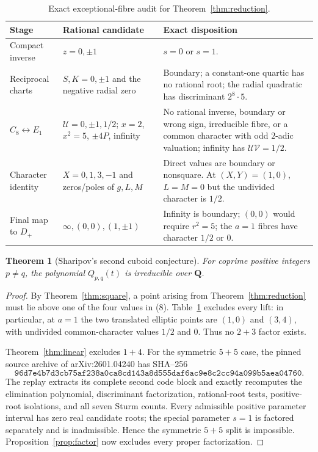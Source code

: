 \documentclass[11pt]{article}
\newtheorem{theorem}{Theorem}
\newcommand{\Q}{\mathbf Q}
\begin{document}
\begin{table}[ht]
\centering
\small
\begin{tabular}{p{}p{}p{}}
\toprule
Stage & Rational candidate & Exact disposition\\
\midrule
Compact inverse & $z=0,\pm1$ & $s=0$ or $s=1$.\\
Reciprocal charts & $S,K=0,\pm1$ and the negative radial zero &
Boundary; a constant-one quartic has no rational root; the radial
quadratic has discriminant $2^8\cdot5$.\\
$C_8\leftrightarrow E_1$ & $\mathcal U=0,\pm1,1/2$; $x=2$, $x^2=5$,
$\pm4P$, infinity & No rational inverse, boundary or wrong sign,
irreducible fibre, or a common character with odd $2$-adic valuation;
infinity has $\mathcal U\mathcal V=1/2$.\\
Character identity & $X=0,1,3,-1$ and zeros/poles of $g,L,M$ &
Direct values are boundary or nonsquare.  At $(X,Y)=(1,0)$,
$L=M=0$ but the undivided character is $1/2$.\\
Final map to $D_+$ & $\infty,(0,0),(1,\pm1)$ &
Infinity is boundary; $(0,0)$ would require $r^2=5$; the $a=1$ fibres
have character $1/2$ or $0$.\\
\bottomrule
\end{tabular}
\caption{Exact exceptional-fibre audit for Theorem~\ref{thm:reduction}.}
\label{tab:exceptions}
\end{table}

\begin{theorem}[Sharipov's second cuboid conjecture]
For coprime positive integers $p\ne q$, the polynomial $Q_{p,q}(t)$ is
irreducible over $\Q$.
\end{theorem}

\begin{proof}
By Theorem~\ref{thm:square}, a point arising from
Theorem~\ref{thm:reduction} must lie above one of the four values in (8).
Table~\ref{tab:exceptions} excludes every lift: in particular, at $a=1$ the
two translated elliptic points are $(1,0)$ and $(3,4)$, with undivided
common-character values $1/2$ and $0$.  Thus no $2+3$ factor exists.

Theorem~\ref{thm:linear} excludes $1+4$.  For the symmetric $5+5$ case, the
pinned source archive of arXiv:2601.04240 has SHA--256
\[
\texttt{96d7e4b7d3cb75af238a0ca8cd143a8d555daf6ac9e8c2cc94a099b5aea04760}.
\]
The replay extracts its complete second code block and exactly recomputes the
elimination polynomial, discriminant factorization, rational-root tests,
positive-root isolations, and all seven Sturm counts.  Every admissible
positive parameter interval has zero real candidate roots; the special
parameter $s=1$ is factored separately and is inadmissible.  Hence the
symmetric $5+5$ split is impossible.  Proposition~\ref{prop:factor} now
excludes every proper factorization.
\end{proof}
\end{document}
